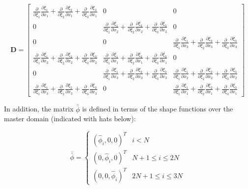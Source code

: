 \documentclass[10pt]{article}
\begin{document}
\begin{equation}
\label{eq:D}
\textbf{D}=\begin{bmatrix}\frac{\partial}{\partial\xi_1}\frac{\partial\xi_1}{\partial x_1}+\frac{\partial}{\partial\xi_2}\frac{\partial\xi_2}{\partial x_1}+\frac{\partial}{\partial\xi_3}\frac{\partial\xi_3}{\partial x_1} & 0 & 0\\
0 & \frac{\partial}{\partial\xi_1}\frac{\partial\xi_1}{\partial x_2}+\frac{\partial}{\partial\xi_2}\frac{\partial\xi_2}{\partial x_2}+\frac{\partial}{\partial\xi_3}\frac{\partial\xi_3}{\partial x_2} & 0\\
0 & 0 & \frac{\partial}{\partial\xi_1}\frac{\partial\xi_1}{\partial x_3}+\frac{\partial}{\partial\xi_2}\frac{\partial\xi_2}{\partial x_3}+\frac{\partial}{\partial\xi_3}\frac{\partial\xi_3}{\partial x_3}\\
\frac{\partial}{\partial\xi_1}\frac{\partial\xi_1}{\partial x_2}+\frac{\partial}{\partial\xi_2}\frac{\partial\xi_2}{\partial x_2}+\frac{\partial}{\partial\xi_3}\frac{\partial\xi_3}{\partial x_2} & \frac{\partial}{\partial\xi_1}\frac{\partial\xi_1}{\partial x_1}+\frac{\partial}{\partial\xi_2}\frac{\partial\xi_2}{\partial x_1}+\frac{\partial}{\partial\xi_3}\frac{\partial\xi_3}{\partial x_1} & 0\\
0 & \frac{\partial}{\partial\xi_1}\frac{\partial\xi_1}{\partial x_3}+\frac{\partial}{\partial\xi_2}\frac{\partial\xi_2}{\partial x_3}+\frac{\partial}{\partial\xi_3}\frac{\partial\xi_3}{\partial x_3} & \frac{\partial}{\partial\xi_1}\frac{\partial\xi_1}{\partial x_2}+\frac{\partial}{\partial\xi_2}\frac{\partial\xi_2}{\partial x_2}+\frac{\partial}{\partial\xi_3}\frac{\partial\xi_3}{\partial x_2}\\
\frac{\partial}{\partial\xi_1}\frac{\partial\xi_1}{\partial x_3}+\frac{\partial}{\partial\xi_2}\frac{\partial\xi_2}{\partial x_3}+\frac{\partial}{\partial\xi_3}\frac{\partial\xi_3}{\partial x_3} & 0 & \frac{\partial}{\partial\xi_1}\frac{\partial\xi_1}{\partial x_1}+\frac{\partial}{\partial\xi_2}\frac{\partial\xi_2}{\partial x_1}+\frac{\partial}{\partial\xi_3}\frac{\partial\xi_3}{\partial x_1}\end{bmatrix}
\end{equation}

In addition, the matrix \(\bar{\bar{\phi}}\) is defined in terms of the shape functions over the master domain (indicated with hats below):

\begin{equation}
\bar{\bar{\phi}}=
\begin{cases}(\hat{\phi}_i, 0, 0)^T & i < N\\(0, \hat{\phi}_i, 0)^T & N+1\leq i\leq 2N \\ (0, 0, \hat{\phi}_i)^T & 2N+1\leq i\leq 3N
\end{cases}
\end{equation}
\end{document}
